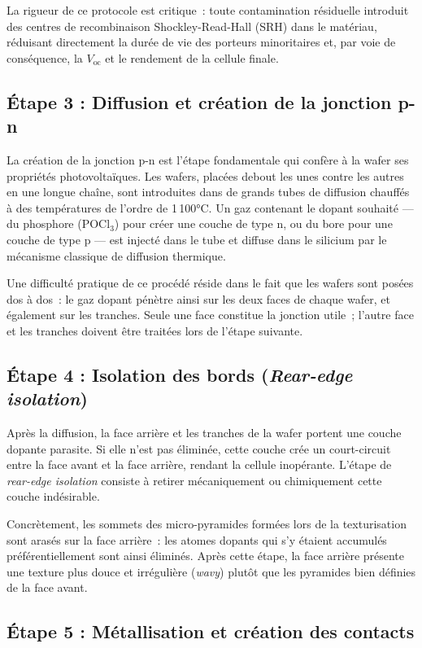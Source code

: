 \documentclass[12pt,a4paper]{report}
\begin{document}
La rigueur de ce protocole est critique~: toute contamination résiduelle introduit des centres de recombinaison Shockley-Read-Hall (SRH) dans le matériau, réduisant directement la durée de vie des porteurs minoritaires et, par voie de conséquence, la $V_\text{oc}$ et le rendement de la cellule finale.

\subsection{Étape 3 : Diffusion et création de la jonction p-n}

La création de la jonction p-n est l'étape fondamentale qui confère à la wafer ses propriétés photovoltaïques. Les wafers, placées debout les unes contre les autres en une longue chaîne, sont introduites dans de grands tubes de diffusion chauffés à des températures de l'ordre de 1\,100°C. Un gaz contenant le dopant souhaité --- du phosphore (POCl$_3$) pour créer une couche de type n, ou du bore pour une couche de type p --- est injecté dans le tube et diffuse dans le silicium par le mécanisme classique de diffusion thermique.

Une difficulté pratique de ce procédé réside dans le fait que les wafers sont posées dos à dos~: le gaz dopant pénètre ainsi sur les deux faces de chaque wafer, et également sur les tranches. Seule une face constitue la jonction utile~; l'autre face et les tranches doivent être traitées lors de l'étape suivante.

\subsection{Étape 4 : Isolation des bords (\textit{Rear-edge isolation})}

Après la diffusion, la face arrière et les tranches de la wafer portent une couche dopante parasite. Si elle n'est pas éliminée, cette couche crée un court-circuit entre la face avant et la face arrière, rendant la cellule inopérante. L'étape de \textit{rear-edge isolation} consiste à retirer mécaniquement ou chimiquement cette couche indésirable.

Concrètement, les sommets des micro-pyramides formées lors de la texturisation sont arasés sur la face arrière~: les atomes dopants qui s'y étaient accumulés préférentiellement sont ainsi éliminés. Après cette étape, la face arrière présente une texture plus douce et irrégulière (\textit{wavy}) plutôt que les pyramides bien définies de la face avant.

\subsection{Étape 5 : Métallisation et création des contacts}
\end{document}
